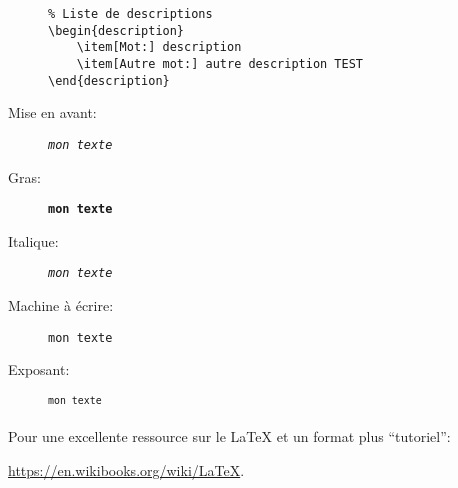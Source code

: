 \begin{description}
\begin{verbatim}
% Liste de descriptions
\begin{description}
	\item[Mot:] description
	\item[Autre mot:] autre description TEST
\end{description}
		\end{verbatim}
	\item[Mise en avant:] \texttt{\emph{mon texte}}
	\item[Gras:] \texttt{\textbf{mon texte}}
	\item[Italique:] \texttt{\textit{mon texte}}
	\item[Machine à écrire:] \texttt{\texttt{mon texte}}
	\item[Exposant:] \texttt{\textsuperscript{mon texte}}
\end{description}

\paragraph{} Pour une excellente ressource sur le \LaTeX{} et un format plus
``tutoriel'':

\url{https://en.wikibooks.org/wiki/LaTeX}.
